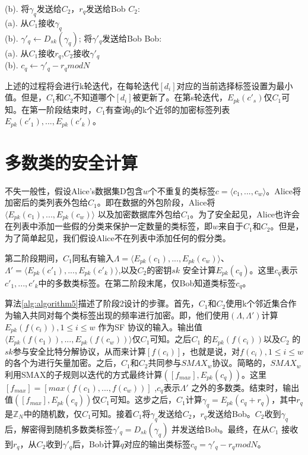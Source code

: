 \begin{algorithm}[H]
\begin{algorithmic}[1]
     (b).\hspace{0.1cm} 将$\gamma_q$发送给$C_2$，$r_q$发送给Bob
    \State $C_2$:\\
     (a).\hspace{0.1cm} 从$C_1$接收$\gamma_q$\\
     (b).\hspace{0.1cm} $\gamma'_q \leftarrow D_{sk}(\gamma_q)$; 将$\gamma'_q$发送给Bob
    \State Bob:\\
     (a).\hspace{0.1cm} 从$C_1$接收$r_q$,$C_2$接收$\gamma'_q$\\
     (b).\hspace{0.1cm} $c_q \leftarrow \gamma'_q -r_q mod N$
\end{algorithmic}
\end{algorithm}
上述的过程将会进行k轮迭代，在每轮迭代$[d_i]$对应的当前选择标签设置为最小值。但是，$C_1$和$C_2$不知道哪个$[d_i]$被更新了。在第s轮迭代，$E_{pk}(c'_s)$仅$C_1$可知。在第一阶段结束时，$C_1$有查询$q$的k个近邻的加密标签列表$E_{pk}(c'_1),...,E_{pk}(c'_k)$。

\section{多数类的安全计算}
不失一般性，假设Alice's数据集D包含$w$个不重复的类标签$c=\langle c_1,...,c_w\rangle$。Alice将加密后的类列表外包给$C_1$。即在数据的外包阶段，Alice将$\langle E_{pk}(c_1),...,E_{pk}(c_w)\rangle$ 以及加密数据库外包给$C_1$。为了安全起见，Alice也许会在列表中添加一些假的分类来保护一定数量的类标签，即$w$来自于$C_1$和$C_2$。但是，为了简单起见，我们假设Alice不在列表中添加任何的假分类。

第二阶段期间，$C_1$同私有输入$\Lambda = \langle E_{pk}(c_1),...,E_{pk}(c_w)\rangle$、$\Lambda'=\langle E_{pk}(c'_1),...,E_{pk}(c'_k)\rangle$,以及$C_2$的密钥$sk$ 安全计算$E_{pk}(c_q)$。这里$c_q$表示$c'_1,...,c'_k$中的多数类标签。在第二阶段末尾，仅Bob知道类标签$c_q$。

算法\ref{alg:algorithm5}描述了阶段2设计的步骤。首先，$C_1$和$C_2$使用k个邻近集合作为输入共同对每个类标签出现的频率进行加密。即，他们使用$(\Lambda,\Lambda')$计算$E_{pk}(f(c_i)),1 \leq i \leq w$ 作为SF 协议的输入。输出值$\langle E_{pk}(f(c_1)),...,E_{pk}(f(c_w))\rangle$仅$C_1$可知。之后$C_1$ 的$E_{pk}(f(c_i))$以及$C_2$ 的$sk$参与安全比特分解协议，从而来计算$[f(c_i)]$，也就是说，对$f(c_i), 1 \leq i \leq w$ 的各个为进行矢量加密。之后，$C_1$和$C_2$共同参与$SMAX_w$协议。简略的，$SMAX_w$ 利用SMAX的子规则以迭代的方式最终计算$([f_{max}],E_{pk}(c_q))$。这里$[f_{max}]=[max(f(c_1),...,f(c_w))]$ ,$c_q$表示$\Lambda'$ 之外的多数类。结束时，输出值$([f_{max}],E_{pk}(c_q))$仅$C_1$可知。这步之后，$C_1$计算$\gamma_q=E_{pk}(c_q+r_q)$，其中$r_q$是$\mathbb{Z}_N$中的随机数，仅$C_1$可知。接着$C_1$将$\gamma_q$发送给$C_2$，$r_q$发送给Bob。$C_2$收到$\gamma_q$ 后，解密得到随机多数类标签$\gamma'_q=D_{sk}(\gamma_q)$ 并发送给Bob。最终，在从$C_1$ 接收到$r_q$，从$C_2$收到$\gamma'_q$后，Bob计算$q$对应的输出类标签$c_q=\gamma'_q-r_q mod N$。

